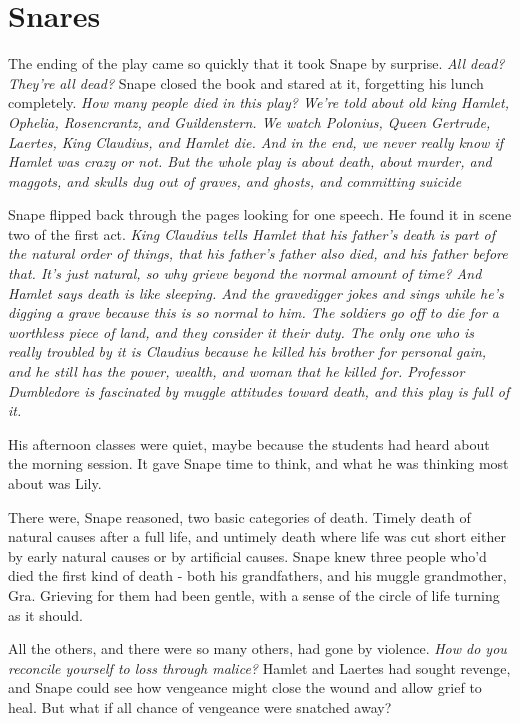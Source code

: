 
\chapter{Snares}

The ending of the play came so quickly that it took Snape by surprise. \emph{All dead? They're all dead?} Snape closed the book and stared at it, forgetting his lunch completely. \emph{How many people died in this play? We're told about old king Hamlet, Ophelia, Rosencrantz, and Guildenstern. We watch Polonius, Queen Gertrude, Laertes, King Claudius, and Hamlet die. And in the end, we never really know if Hamlet was crazy or not. But the whole play is about death, about murder, and maggots, and skulls dug out of graves, and ghosts, and committing suicide{\el}}

Snape flipped back through the pages looking for one speech. He found it in scene two of the first act. \emph{King Claudius tells Hamlet that his father's death is part of the natural order of things, that his father's father also died, and his father before that. It's just natural, so why grieve beyond the normal amount of time? And Hamlet says death is like sleeping. And the gravedigger jokes and sings while he's digging a grave because this is so normal to him. The soldiers go off to die for a worthless piece of land, and they consider it their duty. The only one who is really troubled by it is Claudius because he killed his brother for personal gain, and he still has the power, wealth, and woman that he killed for. Professor Dumbledore is fascinated by muggle attitudes toward death, and this play is full of it.}

His afternoon classes were quiet, maybe because the students had heard about the morning session. It gave Snape time to think, and what he was thinking most about was Lily.

There were, Snape reasoned, two basic categories of death. Timely death of natural causes after a full life, and untimely death where life was cut short either by early natural causes or by artificial causes. Snape knew three people who'd died the first kind of death - both his grandfathers, and his muggle grandmother, Gra. Grieving for them had been gentle, with a sense of the circle of life turning as it should.

All the others, and there were so many others, had gone by violence. \emph{How do you reconcile yourself to loss through malice?} Hamlet and Laertes had sought revenge, and Snape could see how vengeance might close the wound and allow grief to heal. But what if all chance of vengeance were snatched away?

